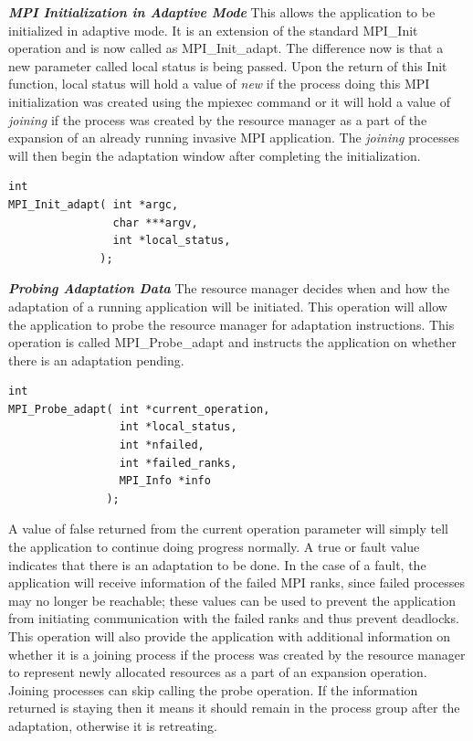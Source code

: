 \textbf{\textit{MPI Initialization in Adaptive Mode}} This allows the application to be initialized in adaptive mode. It is an extension of the standard MPI{\_}Init operation and is now called as MPI{\_}Init{\_}adapt. The difference now is that a new parameter called local status is being passed. Upon the return of this Init function, local status will hold a value of \textit{new} if the process doing this MPI initialization was created using the mpiexec command or it will hold a value of \textit{joining} if the process was created by the resource manager as a part of the expansion of an already running invasive MPI application. The \textit{joining} processes will then begin the adaptation window after completing the initialization. 
\begin{lstlisting}[frame=single]
int 
MPI_Init_adapt( int *argc,
                char ***argv,
                int *local_status,
              );
\end{lstlisting}
\textbf{\textit{Probing Adaptation Data}} The resource manager decides when and how the adaptation of a running application will be initiated. This operation will allow the application to probe the resource manager for adaptation instructions. This operation is called MPI{\_}Probe{\_}adapt and instructs the application on whether there is an adaptation pending.  
\begin{lstlisting}[frame=single]
int
MPI_Probe_adapt( int *current_operation,
                 int *local_status,
                 int *nfailed,
                 int *failed_ranks,
                 MPI_Info *info
               );
\end{lstlisting}
A value of false returned from the current operation parameter will simply tell the application to continue doing progress normally. A true or fault value indicates that there is an adaptation to be done. In the case of a fault, the application will receive information of the failed MPI ranks, since failed processes may no longer be reachable; these values can be used to prevent the application from initiating communication with the failed  ranks and thus prevent deadlocks. This operation will also provide the application with additional information on whether it is a joining process if the process was created by the resource manager to represent newly allocated resources as a part of an expansion operation. Joining processes can skip calling the probe operation. If the information returned is staying then it means it should remain in the process group after the adaptation, otherwise it is retreating.\\ \\
